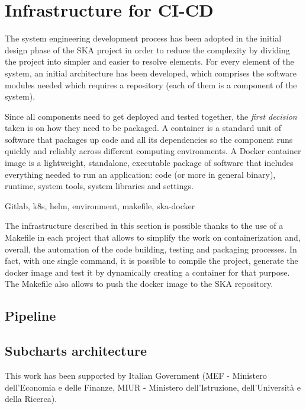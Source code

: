 \documentclass[a4paper]{spie}  %
\begin{document}
\section{Infrastructure for CI-CD}
The system engineering development process has been adopted in the initial design phase of the SKA project in order to reduce the complexity by dividing the project into simpler and easier to resolve elements. For every element of the system, an initial architecture has been developed, which comprises the software modules needed which requires a repository (each of them is a component of the system).

Since all components need to get deployed and tested together, the \textit{first decision} taken is on how they need to be packaged.  A container is a standard unit of software that packages up code and all its dependencies so the component runs quickly and reliably across different computing environments. A Docker container image is a lightweight, standalone, executable package of software that includes everything needed to run an application: code (or more in general binary), runtime, system tools, system libraries and settings.



Gitlab, k8s, helm, environment, makefile, ska-docker

The infrastructure described in this section is possible thanks to the use of a Makefile in each project that allows to simplify the work on containerization and, overall, the automation of the code building, testing and packaging processes. In fact, with one single command, it is possible to compile the project, generate the docker image and test it by dynamically creating a container for that purpose.  The Makefile also allows to push the docker image to the SKA repository. 

\subsection{Pipeline}

\subsection{Subcharts architecture}


\acknowledgments %
 
This work has been supported by Italian Government (MEF - Ministero dell'Economia e delle Finanze, MIUR - Ministero dell'Istruzione, dell'Università e della Ricerca).

\end{document}
